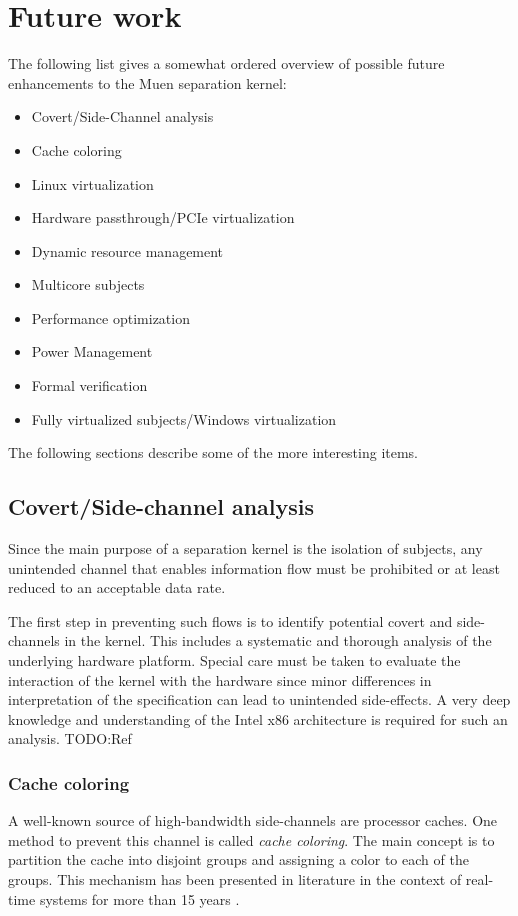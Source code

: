 \section{Future work}
The following list gives a somewhat ordered overview of possible future
enhancements to the Muen separation kernel:

\begin{itemize}
	\item Covert/Side-Channel analysis
	\item Cache coloring
	\item Linux virtualization
	\item Hardware passthrough/PCIe virtualization
	\item Dynamic resource management
	\item Multicore subjects
	\item Performance optimization
	\item Power Management
	\item Formal verification
	\item Fully virtualized subjects/Windows virtualization
\end{itemize}

The following sections describe some of the more interesting items.

\subsection{Covert/Side-channel analysis}
Since the main purpose of a separation kernel is the isolation of subjects, any
unintended channel that enables information flow must be prohibited or at least
reduced to an acceptable data rate.

The first step in preventing such flows is to identify potential covert and
side-channels in the kernel. This includes a systematic and thorough analysis of
the underlying hardware platform. Special care must be taken to evaluate the
interaction of the kernel with the hardware since minor differences in
interpretation of the specification can lead to unintended side-effects. A very
deep knowledge and understanding of the Intel x86 architecture is required for
such an analysis.
TODO:Ref

\subsubsection{Cache coloring}
A well-known source of high-bandwidth side-channels are processor caches. One
method to prevent this channel is called \emph{cache coloring}. The main concept
is to partition the cache into disjoint groups and assigning a color to each of
the groups. This mechanism has been presented in literature in the context of
real-time systems for more than 15 years \cite{Mueller:1995:CSS:216633.216677}
\cite{Liedtke:1997:OCP:523983.828369}.

